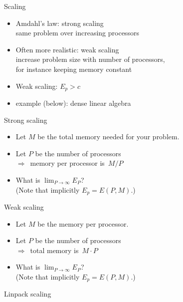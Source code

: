 \begin{numberedframe}{Scaling}
  \begin{itemize}
  \item Amdahl's law: strong scaling\\
    same problem over increasing processors
  \item Often more realistic: weak scaling\\
    increase problem size with number of processors,\\
    for instance keeping memory constant
  \item Weak scaling: $E_p>c$
  \item example (below): dense linear algebra
  \end{itemize}
\end{numberedframe}

\begin{numberedframe}{Strong scaling}
  \begin{itemize}
  \item
    Let $M$ be the total memory needed for your problem.
  \item Let $P$ be the number of processors\\
    $\Rightarrow$~memory per processor is~$M/P$
  \item What is $\lim_{P\rightarrow\infty} E_P$?\\
    (Note that implicitly $E_p=E(P,M)$.)
  \end{itemize}
\end{numberedframe}

\begin{numberedframe}{Weak scaling}
  \begin{itemize}
  \item
    Let $M$ be the memory per processor.
  \item Let $P$ be the number of processors\\
    $\Rightarrow$~total memory is~$M\cdot P$
  \item What is $\lim_{P\rightarrow\infty} E_P$?\\
    (Note that implicitly $E_p=E(P,M)$.)
  \end{itemize}
\end{numberedframe}

\begin{exercise}{Linpack scaling}
  
\end{exercise}

